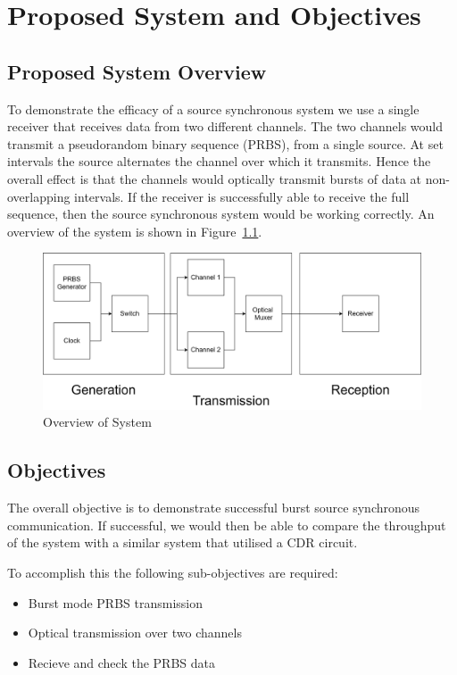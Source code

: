 \chapter{Proposed System and Objectives}

\section{Proposed System Overview}%
\label{sec:system_overview}
To demonstrate the efficacy of a source synchronous system we use a single
receiver that receives data from two different channels.  The two channels
would transmit a pseudorandom binary sequence (PRBS), from a single source. At
set intervals the source alternates the channel over which it transmits.  Hence
the overall effect is that the channels would optically transmit bursts of data
at non-overlapping intervals. If the receiver is successfully able to receive
the full sequence, then the source synchronous system would be working
correctly.  An overview of the system is shown in
Figure~\ref{fig:overview}. 

\begin{figure}[h]
    \centering
    \includegraphics[width=1\linewidth]{img/overview.png}
    \caption{Overview of System}%
    \label{fig:overview}
\end{figure}

\cleardoublepage
\section{Objectives}%
\label{sec:objectives}
The overall objective is to demonstrate successful burst source synchronous
communication.  If successful, we would then be able to compare the throughput
of the system with a similar system that utilised a CDR circuit.

To accomplish this the following sub-objectives are required:
\begin{itemize}
    \item Burst mode PRBS transmission
    \item Optical transmission over two channels
    \item Recieve and check the PRBS data
\end{itemize}
